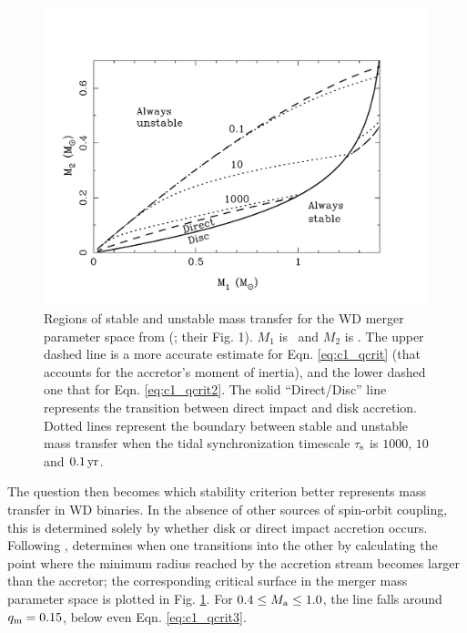 \begin{figure}
\centering
\includegraphics[angle=0,width=0.65\columnwidth]{introduction/figures/marsns04_stab.pdf}
\caption{Regions of stable and unstable mass transfer for the WD merger parameter space from \citeauthor{marsns04} (\citeyear{marsns04}; their Fig. 1).  $M_1$ is \Ma\, and $M_2$ is \Md.  The upper dashed line is a more accurate estimate for Eqn. \ref{eq:c1_qcrit} (that accounts for the accretor's moment of inertia), and the lower dashed one that for Eqn. \ref{eq:c1_qcrit2}.  The solid ``Direct/Disc'' line represents the transition between direct impact and disk accretion.  Dotted lines represent the boundary between stable and unstable mass transfer when the tidal synchronization timescale $\tau_\mathrm{s}$ is $1000$, $10$ and $0.1\,\mathrm{yr}$.}
\label{fig:c1_stability}
\end{figure}

The question then becomes which stability criterion better represents mass transfer in WD binaries.  In the absence of other sources of spin-orbit coupling, this is determined solely by whether disk or direct impact accretion occurs.  Following \cite{lubos75}, \cite{nele+01} determines when one transitions into the other by calculating the point where the minimum radius reached by the accretion stream becomes larger than the accretor; the corresponding critical surface in the merger mass parameter space is plotted in Fig. \ref{fig:c1_stability}.  For $0.4 \leq \Ma \leq 1.0$, the line falls around $\qm = 0.15$, below even Eqn. \ref{eq:c1_qcrit3}.

